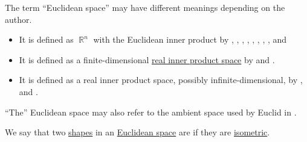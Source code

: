\begin{remark}\label{rem:euclidean_space_etymology}
  The term \enquote{Euclidean space} may have different meanings depending on the author.
  \begin{itemize}
    \item It is defined as \( \BbbR^n \) with the Euclidean inner product by
    ,
    ,
    ,
    ,
    ,
    ,
    ,
    ,
     and

    \item It is defined as a finite-dimensional \hyperref[def:inner_product_space]{real inner product space} by
     and
    .

    \item It is defined as a real inner product space, possibly infinite-dimensional, by
    ,
     and
    .
  \end{itemize}

  \enquote{The} Euclidean space may also refer to the ambient space used by Euclid in \cite{Euclids2008Elements}.
\end{remark}

\begin{definition}\label{def:congruent_shapes}
  We say that two \hyperref[con:geometric_shape]{shapes} in an \hyperref[def:euclidean_space]{Euclidean space} are  if they are \hyperref[def:isometry]{isometric}.
\end{definition}


